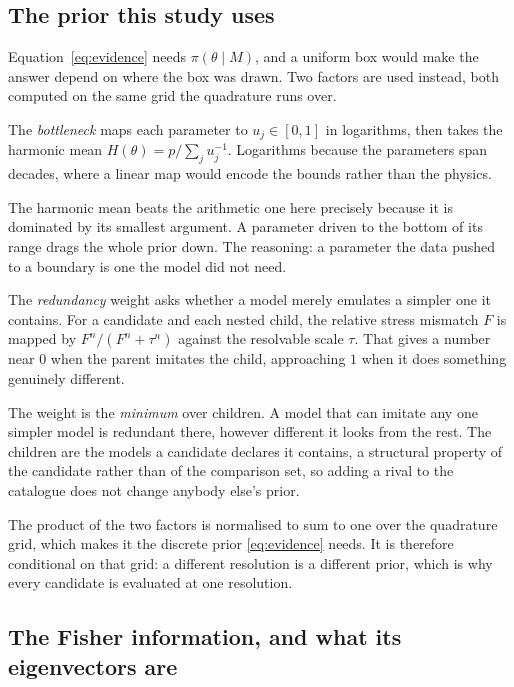 \documentclass[10pt]{article}
\begin{document}
\subsection{The prior this study uses}
\label{sec:prior}

Equation~\eqref{eq:evidence} needs $\pi(\theta\mid M)$, and a uniform box would make the
answer depend on where the box was drawn. Two factors are used instead, both computed on
the same grid the quadrature runs over.

The \emph{bottleneck} maps each parameter to $u_j\in[0,1]$ in logarithms, then takes the
harmonic mean $H(\theta) = p\big/\sum_j u_j^{-1}$. Logarithms because the parameters span
decades, where a linear map would encode the bounds rather than the physics.

The harmonic mean beats the arithmetic one here precisely because it is dominated by its
smallest argument. A parameter driven to the bottom of its range drags the whole prior down.
The reasoning: a parameter the data pushed to a boundary is one the model did not need.

The \emph{redundancy} weight asks whether a model merely emulates a simpler one it contains.
For a candidate and each nested child, the relative stress mismatch $F$ is mapped by
$F^n/(F^n + \tau^n)$ against the resolvable scale $\tau$. That gives a number near $0$ when
the parent imitates the child, approaching $1$ when it does something genuinely different.

The weight is the \emph{minimum} over children. A model that can imitate any one simpler
model is redundant there, however different it looks from the rest. The children are the models
a candidate declares it contains, a structural property of the candidate rather than of the
comparison set, so adding a rival to the catalogue does not change anybody else's prior.

The product of the two factors is normalised to sum to one over the quadrature grid, which makes
it the discrete prior \eqref{eq:evidence} needs. It is therefore conditional on that grid: a
different resolution is a different prior, which is why every candidate is evaluated at one
resolution.

\subsection{The Fisher information, and what its eigenvectors are}
\label{sec:identifiability}
\end{document}
